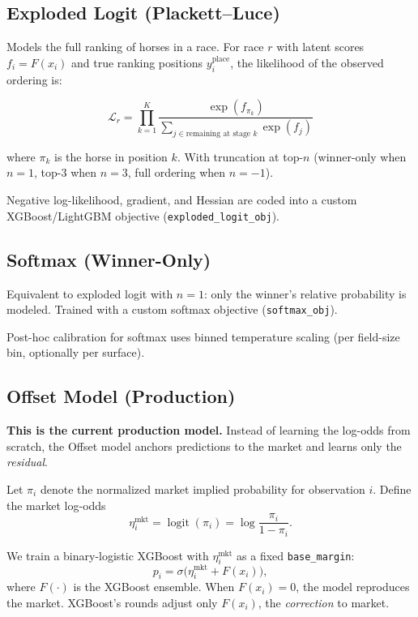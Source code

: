 \documentclass[11pt]{article}
\begin{document}
\subsection{Exploded Logit (Plackett--Luce)}

Models the full ranking of horses in a race. For race $r$ with
latent scores $f_i = F(x_i)$ and true ranking positions $y_i^{\text{place}}$,
the likelihood of the observed ordering is:

\[
\mathcal{L}_r = \prod_{k=1}^{K}
  \frac{\exp(f_{\pi_k})}{\sum_{j \in \text{remaining at stage }k} \exp(f_j)}
\]

where $\pi_k$ is the horse in position $k$. With truncation at top-$n$
(winner-only when $n=1$, top-3 when $n=3$, full ordering when $n=-1$).

Negative log-likelihood, gradient, and Hessian are coded into a
custom XGBoost/LightGBM objective (\texttt{exploded\_logit\_obj}).

\subsection{Softmax (Winner-Only)}

Equivalent to exploded logit with $n=1$: only the winner's relative
probability is modeled. Trained with a custom softmax objective
(\texttt{softmax\_obj}).

Post-hoc calibration for softmax uses binned temperature scaling
(per field-size bin, optionally per surface).

\subsection{Offset Model (Production)}

\textbf{This is the current production model.} Instead of learning
the log-odds from scratch, the Offset model anchors predictions to the
market and learns only the \emph{residual}.

Let $\pi_i$ denote the normalized market implied probability for
observation $i$. Define the market log-odds
\[
\eta_i^{\text{mkt}} = \operatorname{logit}(\pi_i) = \log\frac{\pi_i}{1-\pi_i}.
\]

We train a binary-logistic XGBoost with $\eta_i^{\text{mkt}}$ as a fixed
\texttt{base\_margin}:
\[
p_i = \sigma\bigl(\eta_i^{\text{mkt}} + F(x_i)\bigr),
\]
where $F(\cdot)$ is the XGBoost ensemble. When $F(x_i)=0$, the model
reproduces the market. XGBoost's rounds adjust only $F(x_i)$, the
\emph{correction} to market.
\end{document}
